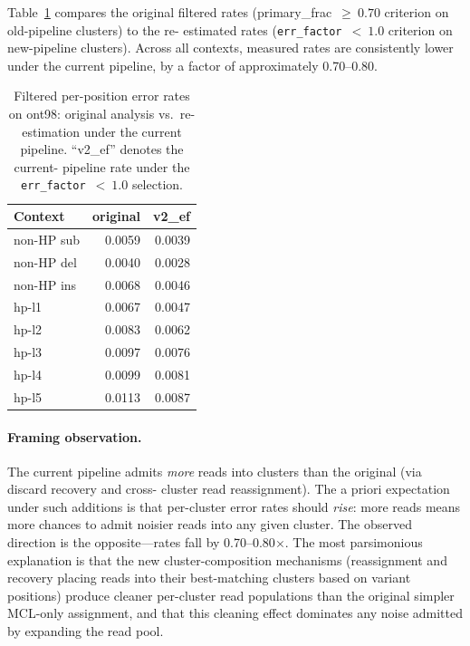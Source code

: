 \documentclass[11pt]{article}
\begin{document}
Table~\ref{tab:reestimation_summary} compares the original filtered rates
(primary\_frac~$\geq~0.70$ criterion on old-pipeline clusters) to the re-
estimated rates (\texttt{err\_factor}~$<~1.0$ criterion on new-pipeline
clusters). Across all contexts, measured rates are consistently lower under
the current pipeline, by a factor of approximately 0.70--0.80.

\begin{table}[h]
\centering
\caption{Filtered per-position error rates on ont98: original analysis vs.\
re-estimation under the current pipeline. ``v2\_ef'' denotes the current-
pipeline rate under the \texttt{err\_factor}~$<~1.0$ selection.}
\label{tab:reestimation_summary}
\begin{tabular}{lrr}
\toprule
Context & original & v2\_ef \\
\midrule
non-HP sub          & 0.0059 & 0.0039 \\
non-HP del          & 0.0040 & 0.0028 \\
non-HP ins          & 0.0068 & 0.0046 \\
\midrule
hp-l1               & 0.0067 & 0.0047 \\
hp-l2               & 0.0083 & 0.0062 \\
hp-l3               & 0.0097 & 0.0076 \\
hp-l4               & 0.0099 & 0.0081 \\
hp-l5               & 0.0113 & 0.0087 \\
\bottomrule
\end{tabular}
\end{table}

\paragraph{Framing observation.} The current pipeline admits \emph{more}
reads into clusters than the original (via discard recovery and cross-
cluster read reassignment). The a priori expectation under such additions
is that per-cluster error rates should \emph{rise}: more reads means
more chances to admit noisier reads into any given cluster. The observed
direction is the opposite---rates fall by 0.70--0.80$\times$. The most
parsimonious explanation is that the new cluster-composition mechanisms
(reassignment and recovery placing reads into their best-matching clusters
based on variant positions) produce cleaner per-cluster read populations
than the original simpler MCL-only assignment, and that this cleaning
effect dominates any noise admitted by expanding the read pool.
\end{document}
